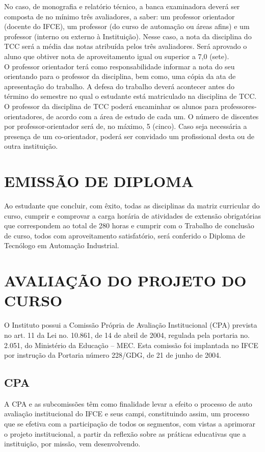 No caso, de monografia e relatório técnico, a banca examinadora deverá ser composta de no mínimo três avaliadores, a saber: um professor orientador (docente do IFCE), um professor (do curso de automação ou áreas afins) e um professor (interno ou externo à Instituição). Nesse caso, a nota da disciplina do TCC será a média das notas atribuída pelos três avaliadores. Será aprovado o aluno que obtiver nota de aproveitamento igual ou superior a 7,0 (sete).\\

O professor orientador terá como responsabilidade informar a nota do seu orientando para o professor da disciplina, bem como, uma cópia da ata de apresentação do trabalho. A defesa do trabalho deverá acontecer antes do término do semestre no qual o estudante está matriculado na disciplina de TCC.\\

O professor da disciplina de TCC poderá encaminhar os alunos para professores-orientadores, de acordo com a área de estudo de cada um. O número de discentes por professor-orientador será de, no máximo, 5 (cinco). Caso seja necessária a presença de um co-orientador, poderá ser convidado um profissional desta ou de outra instituição.\\


\chapter{EMISSÃO DE DIPLOMA}

Ao estudante que concluir, com êxito, todas as disciplinas da matriz curricular do curso, cumprir e comprovar a carga horária de atividades de extensão obrigatórias que correspondem ao total de 280 horas e cumprir com o Trabalho de conclusão de curso, todos com aproveitamento satisfatório, será conferido o Diploma de Tecnólogo em Automação Industrial.\\

\chapter{AVALIAÇÃO DO PROJETO DO CURSO}

O Instituto possui a Comissão Própria de Avaliação Institucional (CPA) prevista no art. 11 da Lei no. 10.861, de 14 de abril de 2004, regulada pela portaria no. 2.051, do Ministério da Educação – MEC. Esta comissão foi implantada no IFCE por instrução da Portaria número 228/GDG, de 21 de junho de 2004.\\
\section{CPA}
A CPA e as subcomissões têm como finalidade levar a efeito o processo de auto avaliação institucional do IFCE e seus campi, constituindo assim, um processo que se efetiva com a participação de todos os segmentos, com vistas a aprimorar o projeto institucional, a partir da reflexão sobre as práticas educativas que a instituição, por missão, vem desenvolvendo.\\

